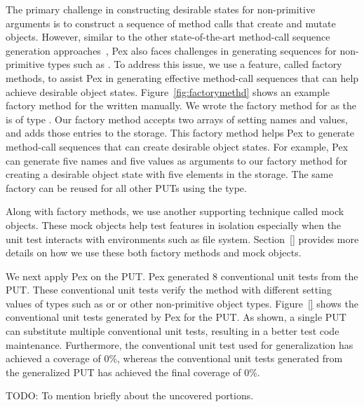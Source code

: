 The primary challenge in constructing desirable states for non-primitive arguments is to construct a sequence of method calls that create and mutate objects. However, similar to the other state-of-the-art method-call sequence generation approaches~\cite{}, Pex also faces challenges in generating sequences for non-primitive types such as . To address this issue, we use a feature, called factory methods, to assist Pex in generating effective method-call sequences that can help achieve desirable object states. Figure~\ref{fig:factorymethd} shows an example factory method for the  written manually. We wrote the factory method for  as the  is of type . Our factory method accepts two arrays of setting names and values, and adds those entries to the storage. This factory method helps Pex to generate method-call sequences that can create desirable object states. For example, Pex can generate five names and five values as arguments to our factory method for creating a desirable object state with five elements in the storage. The same factory can be reused for all other PUTs using the  type.

Along with factory methods, we use another supporting technique called mock objects. These mock objects help test features in isolation especially when the unit test interacts with environments such as file system. Section~\ref{} provides more details on how we use these both factory methods and mock objects.




We next apply Pex on the  PUT. Pex generated $8$ conventional unit tests from the  PUT. These conventional unit tests verify the  method with different setting values of types such as  or  or other non-primitive object types. Figure~\ref{} shows the conventional unit tests generated by Pex for the PUT. As shown, a single PUT can substitute multiple conventional unit tests, resulting in a better test code maintenance. Furthermore, the conventional unit test used for generalization has achieved a coverage of $0$\%, whereas the conventional unit tests generated from the generalized PUT has achieved the final coverage of $0$\%. 

TODO: To mention briefly about the uncovered portions.

